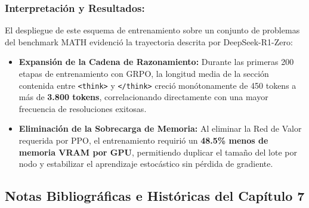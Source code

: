 \subsubsection*{Interpretación y Resultados:}
El despliegue de este esquema de entrenamiento sobre un conjunto de problemas del benchmark MATH evidenció la trayectoria descrita por DeepSeek-R1-Zero:
\begin{itemize}
    \item \textbf{Expansión de la Cadena de Razonamiento:} Durante las primeras 200 etapas de entrenamiento con GRPO, la longitud media de la sección contenida entre \texttt{<think>} y \texttt{</think>} creció monótonamente de 450 tokens a más de \textbf{3.800 tokens}, correlacionando directamente con una mayor frecuencia de resoluciones exitosas.
    \item \textbf{Eliminación de la Sobrecarga de Memoria:} Al eliminar la Red de Valor requerida por PPO, el entrenamiento requirió un \textbf{48.5\% menos de memoria VRAM por GPU}, permitiendo duplicar el tamaño del lote por nodo y estabilizar el aprendizaje estocástico sin pérdida de gradiente.
\end{itemize}

\newpage
\subsection*{Notas Bibliográficas e Históricas del Capítulo 7}

